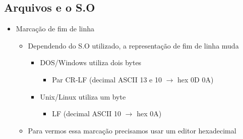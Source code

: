 \documentclass[12pt]{article}
\begin{document}
        \subsection{Arquivos e o S.O}
        \begin{itemize}
            \item Marcação de fim de linha
            \begin{itemize}
                \item Dependendo do S.O utilizado, a representação de fim de 
                linha muda
                \begin{itemize}
                    \item DOS/Windows utiliza dois bytes
                    \begin{itemize}
                        \item Par CR-LF (decimal ASCII 13 e 10 $\rightarrow$ 
                        hex 0D 0A)
                    \end{itemize}
                    \item Unix/Linux utiliza um byte
                    \begin{itemize}
                        \item LF (decimal ASCII 10 $\rightarrow$ hex 0A)
                    \end{itemize}
                \end{itemize}
                \item Para vermos essa marcação precisamos usar um editor 
                hexadecimal
            \end{itemize}
        \end{itemize}
\end{document}
